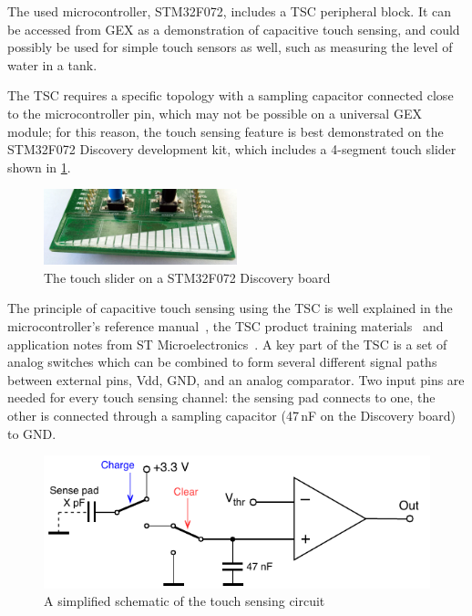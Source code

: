 The used microcontroller, STM32F072, includes a \gls{TSC} peripheral block. It can be accessed from GEX as a demonstration of capacitive touch sensing, and could possibly be used for simple touch sensors as well, such as measuring the level of water in a tank.

The TSC requires a specific topology with a sampling capacitor connected close to the microcontroller pin, which may not be possible on a universal GEX module; for this reason, the touch sensing feature is best demonstrated on the STM32F072 Discovery development kit, which includes a 4-segment touch slider shown in \cref{fig:disco-touch}.

\begin{figure}[h]
	\centering
	\includegraphics[width=0.5\textwidth] {img/disco-touch.jpg}
	\caption{\label{fig:disco-touch}The touch slider on a STM32F072 Discovery board}
\end{figure}

The principle of capacitive touch sensing using the \gls{TSC} is well explained in the microcontroller's reference manual~\cite{f072-rm}, the \gls{TSC} product training materials~\cite{stm-tsc-training, stm-tsc-ppt} and application notes from ST Microelectronics~\cite{stm-tsc-an1, stm-tsc-an2, stm-tsc-an3, stm-tsc-an4}. A key part of the \gls{TSC} is a set of analog switches which can be combined to form several different signal paths between external pins, Vdd, \gls{GND}, and an analog comparator. Two input pins are needed for every touch sensing channel: the sensing pad connects to one, the other is connected through a sampling capacitor  (47\,nF on the Discovery board) to \gls{GND}.

\begin{figure}[h]
	\centering
	\includegraphics[scale=1] {img/tsc-function.pdf}
	\caption{\label{fig:tsc-schem}A simplified schematic of the touch sensing circuit}
\end{figure}

